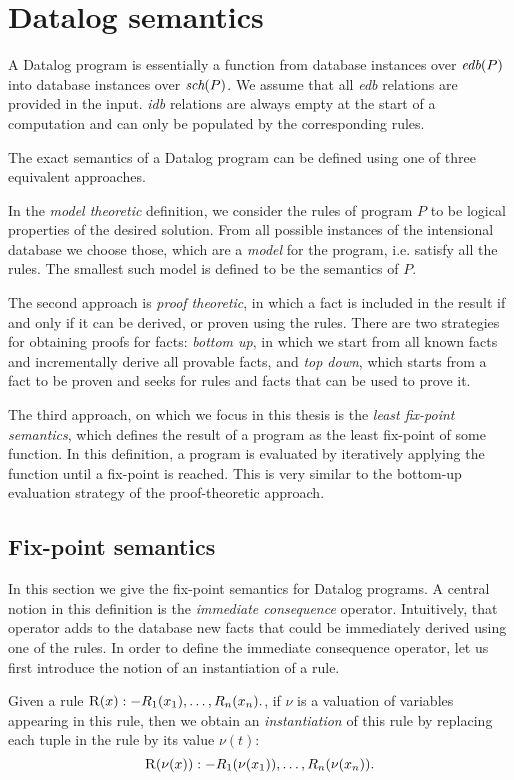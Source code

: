 \section{Datalog semantics}\label{ss:datalogsemantics}
A Datalog program is essentially a function from database instances over $\textit{edb}(P)$ into database instances over $\textit{sch}(P)$. We assume that all \emph{edb} relations are provided in the input. \emph{idb} relations are always empty at the start of a computation and can only be populated by the corresponding rules.

The exact semantics of a Datalog program can be defined using one of three  equivalent approaches.

In the \emph{model theoretic} definition, we consider the rules of program $P$ to be logical properties of the desired solution. From all possible instances of the intensional database we choose those, which are a \emph{model} for the program, i.e. satisfy all the rules. The smallest such model is defined to be the semantics of $P$.

The second approach is \emph{proof theoretic}, in which a fact is included in the result if and only if it can be derived, or proven using the rules. There are two strategies for obtaining proofs for facts: \emph{bottom up}, in which we start from all known facts and incrementally derive all provable facts, and \emph{top down}, which starts from a fact to be proven and seeks for rules and facts that can be used to prove it.

The third approach, on which we focus in this thesis is the \emph{least fix-point semantics}, which defines the result of a program as the least fix-point of some function. In this definition, a program is evaluated by iteratively applying the function until a fix-point is reached. This is very similar to the bottom-up evaluation strategy of the proof-theoretic approach.

\subsection{Fix-point semantics}
In this section we give the fix-point semantics for Datalog programs. A central notion in this definition is the \emph{immediate consequence} operator. Intuitively, that operator adds to the database new facts that could be immediately derived using one of the rules. In order to define the immediate consequence operator, let us first introduce the notion of an instantiation of a rule.

\begin{defn}[Instantiation]
Given a rule $ \textsc{R}(x) :- R_1(x_1), \dots, R_n(x_n). $, if $\nu$ is a valuation of variables appearing in this rule, then we obtain an \emph{instantiation} of this rule by replacing each tuple in the rule by its value $\nu(t)$:
$$ \textsc{R}(\nu(x)) :- R_1(\nu(x_1)), \dots, R_n(\nu(x_n)). $$
\end{defn}

